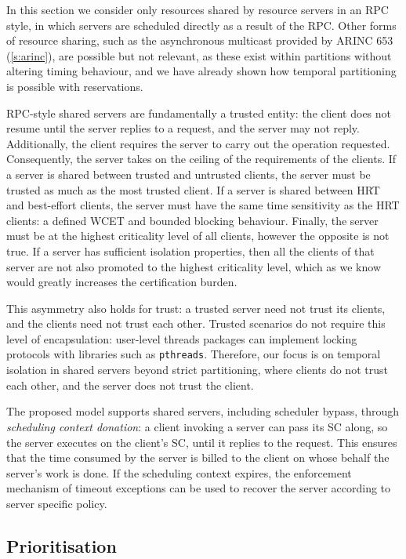 In this section we consider only resources shared by resource servers in an \gls{RPC} style, in
which servers are scheduled directly as a result of the \gls{RPC}. Other forms of resource sharing, such
as the asynchronous multicast provided by ARINC 653 (\cref{s:arinc}), are possible but not
relevant, as these exist within partitions without altering timing behaviour, and we have already shown how temporal partitioning is possible with
reservations. 

\gls{RPC}-style shared servers are fundamentally a trusted entity: the client does not resume until the
server replies to a request, and the server may not reply. Additionally, the client requires the
server to carry out the operation requested. Consequently, the server takes on the ceiling of the
requirements of the clients. If a server is shared between trusted and untrusted clients, the
server must be trusted as much as the most trusted client. If a server is shared between \gls{HRT}
and best-effort clients, the server must have the same time sensitivity as the HRT clients: a defined 
\gls{WCET} and bounded blocking behaviour. Finally, the server must be at the highest criticality
level of all clients, however the opposite is not true. If a server has sufficient isolation
properties, then all the clients of that server are not also promoted to the
highest criticality level, which as we know would greatly increases the certification burden. 

This asymmetry also holds for trust: a trusted server need not trust its clients,
and the clients need not trust each other. 
Trusted scenarios do not require this level of encapsulation: user-level threads packages can implement
locking protocols with libraries such as \texttt{pthreads}. Therefore, our focus is on temporal
isolation in shared servers beyond strict partitioning, where clients do not trust each other, and
the server does not trust the client.

The proposed model supports shared servers, including scheduler
bypass, through \emph{scheduling context
donation}: a client invoking a server can pass its SC along, so the
server executes on the client's SC, until it replies to the
request. This ensures that the time consumed by the server is billed
to the client on whose behalf the server's work is done. If the scheduling context 
expires, the enforcement mechanism of timeout exceptions can be used to recover the server according 
to server specific policy.

\subsection{Prioritisation}

